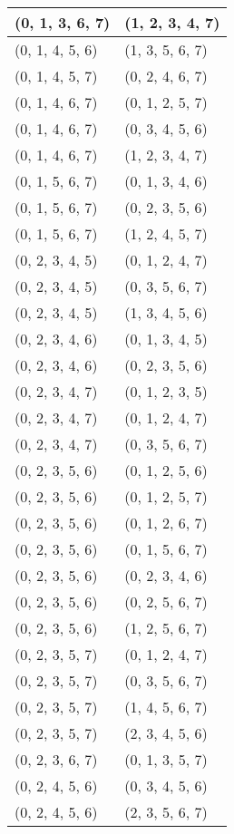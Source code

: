 \begin{footnotesize}
\begin{longtable}[c]{|l|l|}
\\ \hline
(0, 1, 3, 6, 7)
&(1, 2, 3, 4, 7)
\\ \hline
(0, 1, 4, 5, 6)
&(1, 3, 5, 6, 7)
\\ \hline
(0, 1, 4, 5, 7)
&(0, 2, 4, 6, 7)
\\ \hline
(0, 1, 4, 6, 7)
&(0, 1, 2, 5, 7)
\\ \hline
(0, 1, 4, 6, 7)
&(0, 3, 4, 5, 6)
\\ \hline
(0, 1, 4, 6, 7)
&(1, 2, 3, 4, 7)
\\ \hline
(0, 1, 5, 6, 7)
&(0, 1, 3, 4, 6)
\\ \hline
(0, 1, 5, 6, 7)
&(0, 2, 3, 5, 6)
\\ \hline
(0, 1, 5, 6, 7)
&(1, 2, 4, 5, 7)
\\ \hline
(0, 2, 3, 4, 5)
&(0, 1, 2, 4, 7)
\\ \hline
(0, 2, 3, 4, 5)
&(0, 3, 5, 6, 7)
\\ \hline
(0, 2, 3, 4, 5)
&(1, 3, 4, 5, 6)
\\ \hline
(0, 2, 3, 4, 6)
&(0, 1, 3, 4, 5)
\\ \hline
(0, 2, 3, 4, 6)
&(0, 2, 3, 5, 6)
\\ \hline
(0, 2, 3, 4, 7)
&(0, 1, 2, 3, 5)
\\ \hline
(0, 2, 3, 4, 7)
&(0, 1, 2, 4, 7)
\\ \hline
(0, 2, 3, 4, 7)
&(0, 3, 5, 6, 7)
\\ \hline
(0, 2, 3, 5, 6)
&(0, 1, 2, 5, 6)
\\ \hline
(0, 2, 3, 5, 6)
&(0, 1, 2, 5, 7)
\\ \hline
(0, 2, 3, 5, 6)
&(0, 1, 2, 6, 7)
\\ \hline
(0, 2, 3, 5, 6)
&(0, 1, 5, 6, 7)
\\ \hline
(0, 2, 3, 5, 6)
&(0, 2, 3, 4, 6)
\\ \hline
(0, 2, 3, 5, 6)
&(0, 2, 5, 6, 7)
\\ \hline
(0, 2, 3, 5, 6)
&(1, 2, 5, 6, 7)
\\ \hline
(0, 2, 3, 5, 7)
&(0, 1, 2, 4, 7)
\\ \hline
(0, 2, 3, 5, 7)
&(0, 3, 5, 6, 7)
\\ \hline
(0, 2, 3, 5, 7)
&(1, 4, 5, 6, 7)
\\ \hline
(0, 2, 3, 5, 7)
&(2, 3, 4, 5, 6)
\\ \hline
(0, 2, 3, 6, 7)
&(0, 1, 3, 5, 7)
\\ \hline
(0, 2, 4, 5, 6)
&(0, 3, 4, 5, 6)
\\ \hline
(0, 2, 4, 5, 6)
&(2, 3, 5, 6, 7)
\\ \hline

\end{longtable}
\end{footnotesize}
